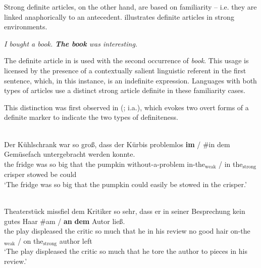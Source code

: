 \documentclass[output=paper,
modfonts
]{langscibook}
\begin{document}
Strong definite articles, on the other hand, are based on familiarity -- i.e. they are linked anaphorically to an antecedent.  illustrates definite articles in strong environments. 

\begin{exe}
\ex \label{ex:irani:13} \textit{I bought a book. \textbf{The book} was interesting.}
\end{exe}

The definite article in  is used with the second occurrence of \textit{book}. This usage is licensed by the presence of a contextually salient linguistic referent in the first sentence, which, in this instance, is an indefinite expression. Languages with both types of articles use a distinct strong article definite in these familiarity cases. 

This distinction was first observed in  (\citealt{Heinrichs1954,Hartmann1982,Schwarz2009}; i.a.), which evokes two overt forms of a definite marker to indicate the two types of definiteness.

\begin{exe} 
\ex \label{ex:irani:14}  \citep[52]{Schwarz2009} \\
\gll Der {K{\"u}hlschrank} {war} {so} {gro{\ss}}, {dass} {der} {K{\"u}rbis} {problemlos}
{\textbf{im}} \textnormal{/} \textnormal{\#}{in} {dem} {Gem{\"u}sefach} {untergebracht} {werden} {konnte}.\\
the fridge was so big that the pumpkin without-a-problem in-the$_\text{weak}$ / \phantom{\#}in the$_\text{strong}$ crisper stowed be could\\
\trans `The fridge was so big that the pumpkin could easily be stowed in the crisper.’ 


\ex \label{ex:irani:15}  \citep[53]{Schwarz2009}\\  {Theaterst{\"u}ck} {missfiel} {dem} {Kritiker} {so} {sehr}, {dass} {er} {in} {seiner} {Besprechung} {kein} {gutes} {Haar} \textnormal{\#}{am} \textnormal{/} {\textbf{an}} {\textbf{dem}} {Autor} {ließ}.\\
the play displeased the critic so much that he in his review no good hair \phantom{\#}on-the$_\text{weak}$ / on the$_\text{strong}$ author left\\
\trans `The play displeased the critic so much that he tore the author to pieces in his review.’ 

\end{exe} 
\end{document}
